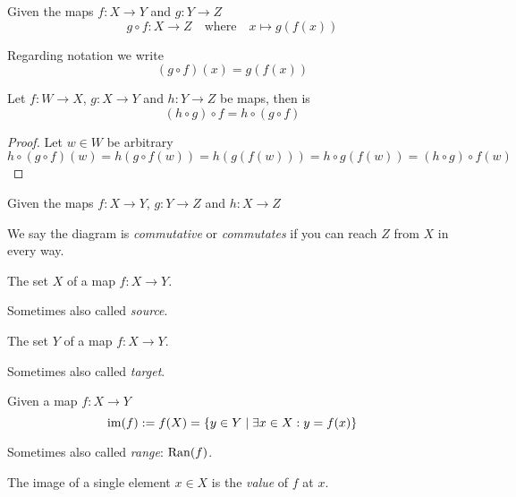 \begin{definition}
   Given the maps \(f: X \to Y\) and \(g: Y \to Z\)
   \[g \circ f: X \to Z \quad\text{where}\quad x \mapsto g(f(x))\]
\end{definition}
\begin{remark}
   Regarding notation we write
   \[(g \circ f)(x) = g(f(x))\]
\end{remark}

\begin{proposition}
   Let \(f: W \to X\), \(g: X \to Y\) and \(h: Y \to Z\) be maps, then is
   \[(h \circ g) \circ f = h \circ (g \circ f)\]
\end{proposition}
\begin{proof}
   Let \(w \in W\) be arbitrary
   \[h \circ (g \circ f)(w) = h(g \circ f(w)) = h(g(f(w))) = h \circ g(f(w)) = (h \circ g) \circ f(w)\]
\end{proof}

\begin{definition}
   Given the maps \(f: X \to Y\), \(g: Y \to Z\) and \(h: X \to Z\)
   \begin{center}
   \end{center}
   We say the diagram is \textit{commutative} or \textit{commutates} if you can reach \(Z\) from \(X\) in every way.
\end{definition}

\begin{definition}\label{def:domain}
   The set \(X\) of a map \(f: X \to Y\).
\end{definition}
\begin{remark}
   Sometimes also called \textit{source}.
\end{remark}

\begin{definition}\label{def:codomain}
   The set \(Y\) of a map \(f: X \to Y\).
\end{definition}
\begin{remark}
   Sometimes also called \textit{target}.
\end{remark}

\begin{definition}
   Given a map \(f: X \to Y\)
   \[\operatorname{im}(f) := f(X) = \{y \in Y \mid \exists x \in X: y = f(x)\}\]
\end{definition}
\begin{remark}
   Sometimes also called \textit{range}: \(\operatorname{Ran}(f)\).
\end{remark}
\begin{remark}
   The image of a single element \(x \in X\) is the \textit{value} of \(f\) at \(x\).
\end{remark}

